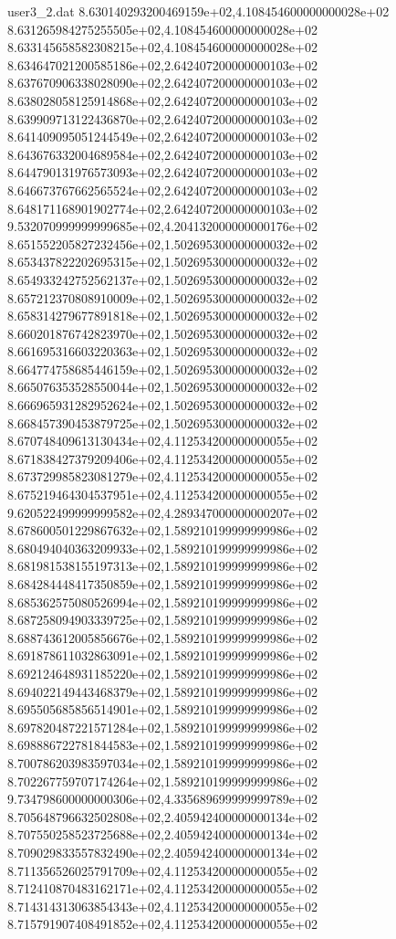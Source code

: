 \begin{filecontents}{user3_2.dat}
8.630140293200469159e+02,4.108454600000000028e+02
8.631265984275255505e+02,4.108454600000000028e+02
8.633145658582308215e+02,4.108454600000000028e+02
8.634647021200585186e+02,2.642407200000000103e+02
8.637670906338028090e+02,2.642407200000000103e+02
8.638028058125914868e+02,2.642407200000000103e+02
8.639909713122436870e+02,2.642407200000000103e+02
8.641409095051244549e+02,2.642407200000000103e+02
8.643676332004689584e+02,2.642407200000000103e+02
8.644790131976573093e+02,2.642407200000000103e+02
8.646673767662565524e+02,2.642407200000000103e+02
8.648171168901902774e+02,2.642407200000000103e+02
9.532070999999999685e+02,4.204132000000000176e+02
8.651552205827232456e+02,1.502695300000000032e+02
8.653437822202695315e+02,1.502695300000000032e+02
8.654933242752562137e+02,1.502695300000000032e+02
8.657212370808910009e+02,1.502695300000000032e+02
8.658314279677891818e+02,1.502695300000000032e+02
8.660201876742823970e+02,1.502695300000000032e+02
8.661695316603220363e+02,1.502695300000000032e+02
8.664774758685446159e+02,1.502695300000000032e+02
8.665076353528550044e+02,1.502695300000000032e+02
8.666965931282952624e+02,1.502695300000000032e+02
8.668457390453879725e+02,1.502695300000000032e+02
8.670748409613130434e+02,4.112534200000000055e+02
8.671838427379209406e+02,4.112534200000000055e+02
8.673729985823081279e+02,4.112534200000000055e+02
8.675219464304537951e+02,4.112534200000000055e+02
9.620522499999999582e+02,4.289347000000000207e+02
8.678600501229867632e+02,1.589210199999999986e+02
8.680494040363209933e+02,1.589210199999999986e+02
8.681981538155197313e+02,1.589210199999999986e+02
8.684284448417350859e+02,1.589210199999999986e+02
8.685362575080526994e+02,1.589210199999999986e+02
8.687258094903339725e+02,1.589210199999999986e+02
8.688743612005856676e+02,1.589210199999999986e+02
8.691878611032863091e+02,1.589210199999999986e+02
8.692124648931185220e+02,1.589210199999999986e+02
8.694022149443468379e+02,1.589210199999999986e+02
8.695505685856514901e+02,1.589210199999999986e+02
8.697820487221571284e+02,1.589210199999999986e+02
8.698886722781844583e+02,1.589210199999999986e+02
8.700786203983597034e+02,1.589210199999999986e+02
8.702267759707174264e+02,1.589210199999999986e+02
9.734798600000000306e+02,4.335689699999999789e+02
8.705648796632502808e+02,2.405942400000000134e+02
8.707550258523725688e+02,2.405942400000000134e+02
8.709029833557832490e+02,2.405942400000000134e+02
8.711356526025791709e+02,4.112534200000000055e+02
8.712410870483162171e+02,4.112534200000000055e+02
8.714314313063854343e+02,4.112534200000000055e+02
8.715791907408491852e+02,4.112534200000000055e+02

\end{filecontents}
